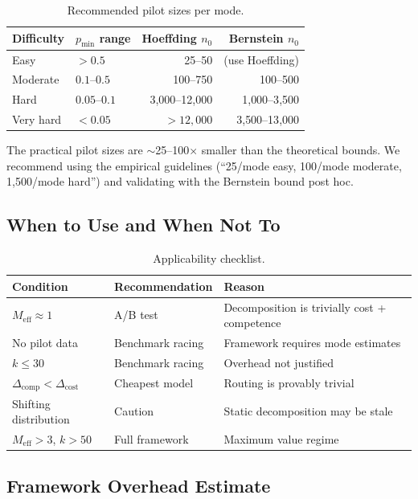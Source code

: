 \documentclass[twoside,11pt]{article}
\newcommand{\Meff}{M_{\mathrm{eff}}}
\newcommand{\pmin}{p_{\min}}
\begin{document}
\begin{table}[ht]
\centering
\caption{Recommended pilot sizes per mode.}
\label{tab:pilot-sizing}
\begin{tabular}{llrr}
\toprule
Difficulty & $\pmin$ range & Hoeffding $n_0$ & Bernstein $n_0$ \\
\midrule
Easy & $> 0.5$ & 25--50 & (use Hoeffding) \\
Moderate & $0.1$--$0.5$ & 100--750 & 100--500 \\
Hard & $0.05$--$0.1$ & 3{,}000--12{,}000 & 1{,}000--3{,}500 \\
Very hard & $< 0.05$ & $> 12{,}000$ & 3{,}500--13{,}000 \\
\bottomrule
\end{tabular}
\end{table}

The practical pilot sizes are $\sim$25--100$\times$ smaller than the theoretical bounds.
We recommend using the empirical guidelines (``25/mode easy, 100/mode moderate, 1{,}500/mode hard'') and validating with the Bernstein bound post hoc.

\subsection{When to Use and When Not To}

\begin{table}[ht]
\centering
\caption{Applicability checklist.}
\label{tab:applicability}
\begin{tabular}{lll}
\toprule
Condition & Recommendation & Reason \\
\midrule
$\Meff \approx 1$ & A/B test & Decomposition is trivially cost + competence \\
No pilot data & Benchmark racing & Framework requires mode estimates \\
$k \le 30$ & Benchmark racing & Overhead not justified \\
$\Delta_{\mathrm{comp}} < \Delta_{\mathrm{cost}}$ & Cheapest model & Routing is provably trivial \\
Shifting distribution & Caution & Static decomposition may be stale \\
$\Meff > 3$, $k > 50$ & Full framework & Maximum value regime \\
\bottomrule
\end{tabular}
\end{table}

\subsection{Framework Overhead Estimate}
\end{document}
